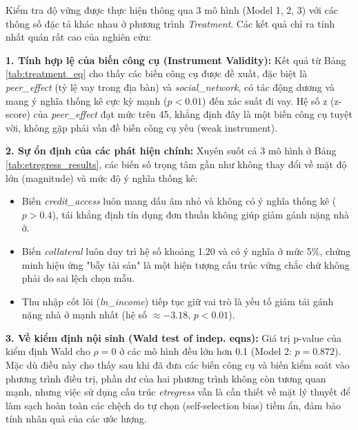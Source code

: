 \documentclass[12pt,a4paper]{report}
\begin{document}
Kiểm tra độ vững được thực hiện thông qua 3 mô hình (Model 1, 2, 3) với các thông số đặc tả khác nhau ở phương trình \textit{Treatment}. Các kết quả chỉ ra tính nhất quán rất cao của nghiên cứu:

\textbf{1. Tính hợp lệ của biến công cụ (Instrument Validity):} 
Kết quả từ Bảng \ref{tab:treatment_eq} cho thấy các biến công cụ được đề xuất, đặc biệt là \textit{peer\_effect} (tỷ lệ vay trong địa bàn) và \textit{social\_network}, có tác động dương và mang ý nghĩa thống kê cực kỳ mạnh ($p < 0.01$) đến xác suất đi vay. Hệ số z (z-score) của \textit{peer\_effect} đạt mức trên 45, khẳng định đây là một biến công cụ tuyệt vời, không gặp phải vấn đề biến công cụ yếu (weak instrument).

\textbf{2. Sự ổn định của các phát hiện chính:}
Xuyên suốt cả 3 mô hình ở Bảng \ref{tab:etregress_results}, các biến số trọng tâm gần như không thay đổi về mặt độ lớn (magnitude) và mức độ ý nghĩa thống kê:
\begin{itemize}
	\item Biến \textit{credit\_access} luôn mang dấu âm nhỏ và không có ý nghĩa thống kê ($p > 0.4$), tái khẳng định tín dụng đơn thuần không giúp giảm gánh nặng nhà ở.
	\item Biến \textit{collateral} luôn duy trì hệ số khoảng 1.20 và có ý nghĩa ở mức 5\%, chứng minh hiệu ứng "bẫy tài sản" là một hiện tượng cấu trúc vững chắc chứ không phải do sai lệch chọn mẫu.
	\item Thu nhập cốt lõi (\textit{ln\_income}) tiếp tục giữ vai trò là yếu tố giảm tải gánh nặng nhà ở mạnh nhất (hệ số $\approx -3.18$, $p < 0.01$).
\end{itemize}

\textbf{3. Về kiểm định nội sinh (Wald test of indep. eqns):}
Giá trị p-value của kiểm định Wald cho $\rho = 0$ ở các mô hình đều lớn hơn 0.1 (Model 2: $p = 0.872$). Mặc dù điều này cho thấy sau khi đã đưa các biến công cụ và biến kiểm soát vào phương trình điều trị, phần dư của hai phương trình không còn tương quan mạnh, nhưng việc sử dụng cấu trúc \textit{etregress} vẫn là cần thiết về mặt lý thuyết để làm sạch hoàn toàn các chệch do tự chọn (self-selection bias) tiềm ẩn, đảm bảo tính nhân quả của các ước lượng.

\newpage
\printbibliography
{}
\end{document}
